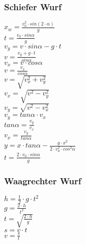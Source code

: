 \subsubsection{Schiefer Wurf} 
\begin{minipage}{0.45\textwidth} 
$ x_{w}  = \frac{v_{0} ^{2} \cdot sin(2\cdot \alpha )}{       g} $\\ 
$ t =\frac{v_{0} \cdot sin \alpha }{  g} $\\ 
$ v_{y}  =  v\cdot sin\alpha - g\cdot t $\\ 
$ v= \frac{ v_{y} +g\cdot t}{ sin\alpha } $\\ 
$ v_{x}  = v\cdot  cos\alpha $\\ 
$ v= \frac{ v_{x} }{ cos\alpha } $\\ 
$ v= \sqrt{ v_{x} ^{2} + v_{y} ^{2} } $\\ 
$ v_{x} = \sqrt{ v^{2}  - v_{y} ^{2} } $\\ 
$ v_{y} = \sqrt{ v^{2}  - v_{x} ^{2} } $\\ 
$ v_{y} = tan \alpha \cdot  v_{x} $\\ 
$ tan \alpha = \frac{v_{y} }{v_{x} } $\\ 
$ v_{x} = \frac{v_{y} }{tan \alpha } $\\ 
$ y = x\cdot tan \alpha  - \frac{   g\cdot x^{2} }{2\cdot v^{2} _{0} \cdot cos ^{2}\alpha } $\\ 
$ t =\frac{2\cdot v_{0} \cdot sin \alpha }{ g} $\\ 
\end{minipage} 
\begin{minipage}{0.45\textwidth} 
 
\end{minipage} 
\subsubsection{Waagrechter Wurf} 
\begin{minipage}{0.45\textwidth} 
$ h = \frac{1}{2}\cdot g\cdot t^{2} $\\ 
$ g = \frac{2\cdot h}{t^{2} } $\\ 
$ t = \sqrt{\frac{2\cdot h}{g}} $\\ 
$ s = v\cdot t $\\ 
$ v = \frac{s}{t} $\\ 
\end{minipage} 
\begin{minipage}{0.45\textwidth} 
 
\end{minipage} 
